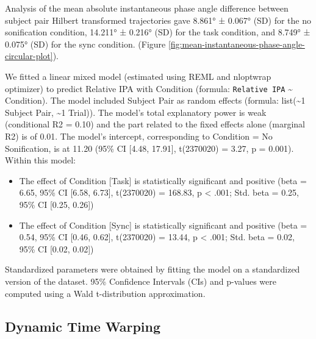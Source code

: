 \documentclass[10pt,a4paper,onecolumn]{article}
\providecommand{\tightlist}{%
  \setlength{\itemsep}{0pt}\setlength{\parskip}{0pt}}
\begin{document}
Analysis of the mean absolute instantaneous phase angle difference between subject pair Hilbert transformed trajectories gave
8.861° ± 0.067° (SD) for the no sonification condition,
14.211° ± 0.216° (SD) for the task condition, and
8.749° ± 0.075° (SD) for the sync condition. (Figure \ref{fig:mean-instantaneous-phase-angle-circular-plot}).

We fitted a linear mixed model (estimated using REML and nloptwrap optimizer) to predict Relative IPA with Condition (formula: \texttt{Relative\ IPA} \textasciitilde{} Condition). The model included Subject Pair as random effects (formula: list(\textasciitilde1 \textbar{} Subject Pair, \textasciitilde1 \textbar{} Trial)). The model's total explanatory power is weak (conditional R2 = 0.10) and the part related to the fixed effects alone (marginal R2) is of 0.01. The model's intercept, corresponding to Condition = No Sonification, is at 11.20 (95\% CI {[}4.48, 17.91{]}, t(2370020) = 3.27, p = 0.001). Within this model:

\begin{itemize}
\tightlist
\item
  The effect of Condition {[}Task{]} is statistically significant and positive (beta = 6.65, 95\% CI {[}6.58, 6.73{]}, t(2370020) = 168.83, p \textless{} .001; Std. beta = 0.25, 95\% CI {[}0.25, 0.26{]})
\item
  The effect of Condition {[}Sync{]} is statistically significant and positive (beta = 0.54, 95\% CI {[}0.46, 0.62{]}, t(2370020) = 13.44, p \textless{} .001; Std. beta = 0.02, 95\% CI {[}0.02, 0.02{]})
\end{itemize}

Standardized parameters were obtained by fitting the model on a standardized version of the dataset. 95\% Confidence Intervals (CIs) and p-values were computed using a Wald t-distribution approximation.

\hypertarget{dynamic-time-warping-1}{%
\subsection{Dynamic Time Warping}\label{dynamic-time-warping-1}}
\end{document}
